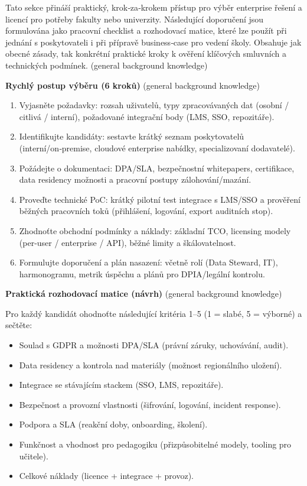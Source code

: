 Tato sekce přináší praktický, krok‑za‑krokem přístup pro výběr enterprise řešení a licencí pro potřeby fakulty nebo univerzity. Následující doporučení jsou formulována jako pracovní checklist a rozhodovací matice, které lze použít při jednání s poskytovateli i při přípravě business‑case pro vedení školy. Obsahuje jak obecné zásady, tak konkrétní praktické kroky k ověření klíčových smluvních a technických podmínek. (general background knowledge)

\bigskip

\textbf{Rychlý postup výběru (6 kroků)} (general background knowledge)
\begin{enumerate}
  \item Vyjasněte požadavky: rozsah uživatelů, typy zpracovávaných dat (osobní / citlivá / interní), požadované integrační body (LMS, SSO, repozitáře).
  \item Identifikujte kandidáty: sestavte krátký seznam poskytovatelů (interní/on‑premise, cloudové enterprise nabídky, specializovaní dodavatelé).
  \item Požádejte o dokumentaci: DPA/SLA, bezpečnostní whitepapers, certifikace, data residency možnosti a pracovní postupy zálohování/mazání.
  \item Proveďte technické PoC: krátký pilotní test integrace s LMS/SSO a prověření běžných pracovních toků (přihlášení, logování, export auditních stop).
  \item Zhodnoťte obchodní podmínky a náklady: základní TCO, licensing modely (per‑user / enterprise / API), běžné limity a škálovatelnost.
  \item Formulujte doporučení a plán nasazení: včetně rolí (Data Steward, IT), harmonogramu, metrik úspěchu a plánů pro DPIA/legální kontrolu.
\end{enumerate}

\bigskip

\textbf{Praktická rozhodovací matice (návrh)} (general background knowledge)

\noindent Pro každý kandidát ohodnoťte následující kritéria 1–5 (1 = slabé, 5 = výborné) a sečtěte:
\begin{itemize}
  \item Soulad s GDPR a možnosti DPA/SLA (právní záruky, uchovávání, audit).
  \item Data residency a kontrola nad materiály (možnost regionálního uložení).
  \item Integrace se stávajícím stackem (SSO, LMS, repozitáře).
  \item Bezpečnost a provozní vlastnosti (šifrování, logování, incident response).
  \item Podpora a SLA (reakční doby, onboarding, školení).
  \item Funkčnost a vhodnost pro pedagogiku (přizpůsobitelné modely, tooling pro učitele).
  \item Celkové náklady (licence + integrace + provoz).
\end{itemize}

